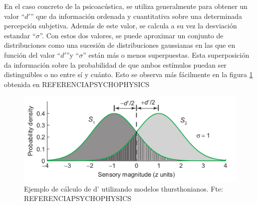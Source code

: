 \documentclass[11pt,a4paper,twoside]{book}
\begin{document}
            En el caso concreto de la psicoacústica, se utiliza generalmente para obtener un valor ``$d'$'' que da información ordenada y cuantitativa sobre una determinada percepción subjetiva. Además de este valor, se calcula a su vez la desviación estandar ``$\sigma$''. Con estos dos valores, se puede aproximar un conjunto de distribuciones como una sucesión de distribuciones gaussianas en las que en función del valor ``$d'$''y ``$\sigma$'' están más o menos superpuestas. Esta superposición da información sobre la probabilidad de que ambos estímulos puedan ser distinguibles o no entre sí y cuánto. Esto se observa más fácilmente en la figura \ref{fig:modelost} obtenida en REFERENCIAPSYCHOPHYSICS
            
            \begin{figure}
                    \includegraphics[scale=0.7]{../imagenes/modelosthurst.png}
			        \centering
			        \caption{Ejemplo de cálculo de d' utilizando modelos thursthonianos. Fte: REFERENCIAPSYCHOPHYSICS}
			        \label{fig:modelost}
                \end{figure}
            
    
\end{document}

